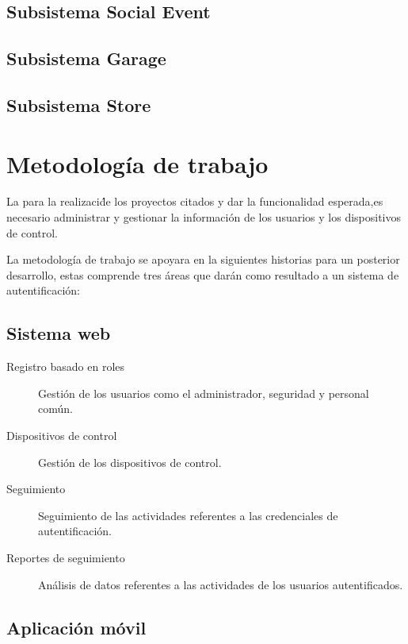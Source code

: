 \documentclass[11pt,twocolumn]{article}
\begin{document}
\subsection{Subsistema Social Event}

\subsection{Subsistema Garage}

\subsection{Subsistema Store}


\section{Metodolog\'ia de trabajo}  

La para la realizaci\' de los proyectos citados y dar la funcionalidad 
esperada,es necesario  administrar y gestionar la informaci\'on de los usuarios y los 
dispositivos de control.

La metodolog\'ia de trabajo se apoyara en la siguientes historias para un posterior 
desarrollo, estas  comprende tres \'areas  que dar\'an como resultado a un 
sistema de autentificaci\'on:\\

	\subsection{ Sistema web }
	
	\begin{description}
		\item [Registro basado en roles] Gesti\'on de los usuarios como el 
		administrador, seguridad y personal com\'un.
		\item [Dispositivos de control] Gesti\'on de los dispositivos de control.
		\item [Seguimiento] Seguimiento de las actividades referentes a las 
		credenciales de autentificaci\'on.
		\item [Reportes de seguimiento] An\'alisis de datos referentes a las 
		actividades de los usuarios autentificados.
	\end{description}
	
	\subsection{Aplicaci\'on m\'ovil}		
	
\end{document}
